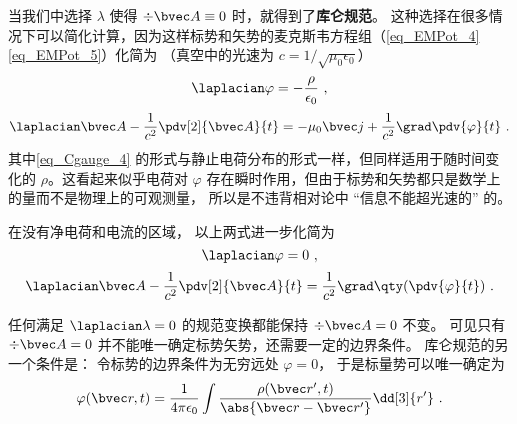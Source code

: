 

当我们中选择 $\lambda$ 使得 $\div \bvec A \equiv 0$ 时，就得到了\textbf{库仑规范}。 这种选择在很多情况下可以简化计算，因为这样标势和矢势的麦克斯韦方程组（\autoref{eq_EMPot_4}  \autoref{eq_EMPot_5}）化简为 （真空中的光速为 $c = 1/\sqrt{\mu_0\epsilon_0}$）%
\begin{equation}\label{eq_Cgauge_4}
\laplacian \varphi = -\frac{\rho}{\epsilon_0}~,
\end{equation}
\begin{equation}\label{eq_Cgauge_3}
\laplacian \bvec A - \frac{1}{c^2} \pdv[2]{\bvec A}{t} = -\mu_0\bvec j + \frac{1}{c^2} \grad \pdv{\varphi}{t}~.
\end{equation}
其中\autoref{eq_Cgauge_4} 的形式与静止电荷分布的形式一样，但同样适用于随时间变化的 $\rho$。这看起来似乎电荷对 $\varphi$ 存在瞬时作用，但由于标势和矢势都只是数学上的量而不是物理上的可观测量， 所以是不违背相对论中 “信息不能超光速的” 的。

在没有净电荷和电流的区域， 以上两式进一步化简为
\begin{equation}
\laplacian \varphi = 0~,
\end{equation}
\begin{equation}
\laplacian \bvec A - \frac{1}{c^2}\pdv[2]{\bvec A}{t} = \frac{1}{c^2} \grad\qty(\pdv{\varphi}{t})~.
\end{equation}

任何满足 $\laplacian \lambda = 0$ 的规范变换都能保持 $\div \bvec A = 0$ 不变。 可见只有 $\div \bvec A = 0$ 并不能唯一确定标势矢势，还需要一定的边界条件。 库仑规范的另一个条件是： 令标势的边界条件为无穷远处 $\varphi = 0$， 于是标量势可以唯一确定为
\begin{equation}\label{eq_Cgauge_1}
\varphi(\bvec r, t) = \frac{1}{4\pi\epsilon_0} \int \frac{\rho(\bvec r', t)}{\abs{\bvec r - \bvec r'}} \dd[3]{r'}~.
\end{equation}


